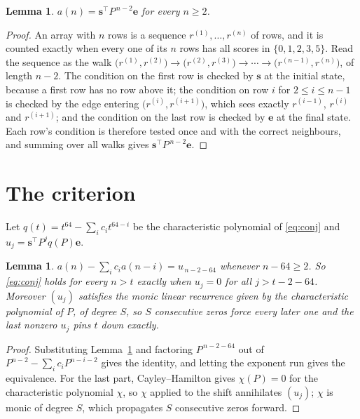 \documentclass[11pt,a4paper]{article}
\theoremstyle{plain}
\newtheorem{lemma}[theorem]{Lemma}
\theoremstyle{definition}
\begin{document}
\begin{lemma}\label{lem:walk}
$a(n)=\mathbf{s}^{\!\top}P^{\,n-2}\mathbf{e}$ for every $n\ge2$.
\end{lemma}

\begin{proof}
An array with $n$ rows is a sequence $r^{(1)},\dots,r^{(n)}$ of rows, and it is counted
exactly when every one of its $n$ rows has all scores in $\{0,1,2,3,5\}$. Read the sequence as the
walk $\bigl(r^{(1)},r^{(2)}\bigr)\to\bigl(r^{(2)},r^{(3)}\bigr)\to\cdots\to
\bigl(r^{(n-1)},r^{(n)}\bigr)$, of length $n-2$. The condition on the first row is
checked by $\mathbf{s}$ at the initial state, because a first row has no row above it; the
condition on row $i$ for $2\le i\le n-1$ is checked by the edge entering
$\bigl(r^{(i)},r^{(i+1)}\bigr)$, which sees exactly $r^{(i-1)}$, $r^{(i)}$ and
$r^{(i+1)}$; and the condition on the last row is checked by $\mathbf{e}$ at the final
state. Each row's condition is therefore tested once and with the correct neighbours, and
summing over all walks gives $\mathbf{s}^{\!\top}P^{\,n-2}\mathbf{e}$.
\end{proof}

\section{The criterion}

Let $q(t)=t^{64}-\sum_i c_i t^{64-i}$ be the characteristic polynomial of
\eqref{eq:conj} and $u_j=\mathbf{s}^{\!\top}P^{j}q(P)\mathbf{e}$.

\begin{lemma}\label{lem:crit}
$a(n)-\sum_i c_i a(n-i)=u_{\,n-2-64}$ whenever $n-64\ge2$. So \eqref{eq:conj}
holds for every $n>t$ exactly when $u_j=0$ for all $j>t-2-64$. Moreover $(u_j)$
satisfies the monic linear recurrence given by the characteristic polynomial of $P$, of
degree $S$, so $S$ consecutive zeros force every later one and the last nonzero $u_j$ pins
$t$ down exactly.
\end{lemma}

\begin{proof}
Substituting Lemma~\ref{lem:walk} and factoring $P^{\,n-2-64}$ out of
$P^{n-2}-\sum_i c_i P^{n-i-2}$ gives the identity, and letting the exponent run gives the
equivalence. For the last part, Cayley--Hamilton gives $\chi(P)=0$ for the characteristic
polynomial $\chi$, so $\chi$ applied to the shift annihilates $(u_j)$; $\chi$ is monic of
degree $S$, which propagates $S$ consecutive zeros forward.
\end{proof}
\end{document}
